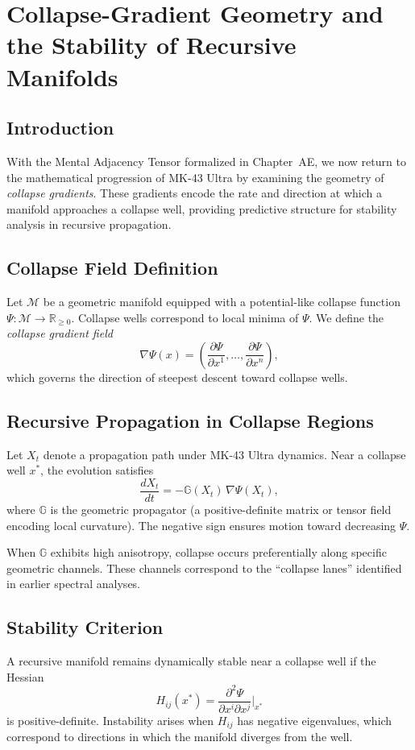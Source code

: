 
\chapter{Collapse-Gradient Geometry and the Stability of Recursive Manifolds}

\section{Introduction}
With the Mental Adjacency Tensor formalized in Chapter~AE, we now return to the mathematical progression of MK-43 Ultra by examining the geometry of \emph{collapse gradients}. These gradients encode the rate and direction at which a manifold approaches a collapse well, providing predictive structure for stability analysis in recursive propagation.

\section{Collapse Field Definition}
Let $\mathcal{M}$ be a geometric manifold equipped with a potential-like collapse function $\Psi : \mathcal{M} \to \mathbb{R}_{\ge 0}$. Collapse wells correspond to local minima of $\Psi$. We define the \emph{collapse gradient field}
\[
\nabla \Psi (x) = \left( \frac{\partial \Psi}{\partial x^1}, \ldots, \frac{\partial \Psi}{\partial x^n} \right),
\]
which governs the direction of steepest descent toward collapse wells.

\section{Recursive Propagation in Collapse Regions}
Let $X_t$ denote a propagation path under MK-43 Ultra dynamics. Near a collapse well $x^\ast$, the evolution satisfies
\[
\frac{dX_t}{dt} = -\mathbb{G}(X_t)\,\nabla\Psi(X_t),
\]
where $\mathbb{G}$ is the geometric propagator (a positive-definite matrix or tensor field encoding local curvature). The negative sign ensures motion toward decreasing $\Psi$.

When $\mathbb{G}$ exhibits high anisotropy, collapse occurs preferentially along specific geometric channels. These channels correspond to the ``collapse lanes'' identified in earlier spectral analyses.

\section{Stability Criterion}
A recursive manifold remains dynamically stable near a collapse well if the Hessian
\[
H_{ij}(x^\ast) = \frac{\partial^2 \Psi}{\partial x^i \partial x^j}\bigg|_{x^\ast}
\]
is positive-definite. Instability arises when $H_{ij}$ has negative eigenvalues, which correspond to directions in which the manifold diverges from the well.

